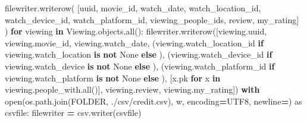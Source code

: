 \documentclass[
]{article}
\newenvironment{Shaded}{\begin{snugshade}}{\end{snugshade}}
\newcommand{\BuiltInTok}[1]{#1}
\newcommand{\ControlFlowTok}[1]{\textcolor[rgb]{0.13,0.29,0.53}{\textbf{#1}}}
\newcommand{\ImportTok}[1]{#1}
\newcommand{\KeywordTok}[1]{\textcolor[rgb]{0.13,0.29,0.53}{\textbf{#1}}}
\newcommand{\NormalTok}[1]{#1}
\newcommand{\OperatorTok}[1]{\textcolor[rgb]{0.81,0.36,0.00}{\textbf{#1}}}
\newcommand{\StringTok}[1]{\textcolor[rgb]{0.31,0.60,0.02}{#1}}
\newcommand{\VariableTok}[1]{\textcolor[rgb]{0.00,0.00,0.00}{#1}}
\begin{document}
\begin{Shaded}
\begin{Highlighting}[]
\NormalTok{                filewriter.writerow(}
\NormalTok{                    [}\StringTok{\textquotesingle{}uuid\textquotesingle{}}\NormalTok{, }\StringTok{\textquotesingle{}movie\_id\textquotesingle{}}\NormalTok{, }\StringTok{\textquotesingle{}watch\_date\textquotesingle{}}\NormalTok{, }\StringTok{\textquotesingle{}watch\_location\_id\textquotesingle{}}\NormalTok{, }\StringTok{\textquotesingle{}watch\_device\_id\textquotesingle{}}\NormalTok{, }\StringTok{\textquotesingle{}watch\_platform\_id\textquotesingle{}}\NormalTok{,}
                     \StringTok{\textquotesingle{}viewing\_people\_ids\textquotesingle{}}\NormalTok{, }\StringTok{\textquotesingle{}review\textquotesingle{}}\NormalTok{, }\StringTok{\textquotesingle{}my\_rating\textquotesingle{}}\NormalTok{]}
\NormalTok{                )}
                \ControlFlowTok{for}\NormalTok{ viewing }\KeywordTok{in}\NormalTok{ Viewing.objects.}\BuiltInTok{all}\NormalTok{():}
\NormalTok{                    filewriter.writerow([viewing.uuid, viewing.movie\_id, viewing.watch\_date,}
\NormalTok{                                         (viewing.watch\_location\_id }\ControlFlowTok{if}\NormalTok{ viewing.watch\_location }\KeywordTok{is} \KeywordTok{not} \VariableTok{None} \ControlFlowTok{else} \StringTok{\textquotesingle{}\textquotesingle{}}\NormalTok{),}
\NormalTok{                                         (viewing.watch\_device\_id }\ControlFlowTok{if}\NormalTok{ viewing.watch\_device }\KeywordTok{is} \KeywordTok{not} \VariableTok{None} \ControlFlowTok{else} \StringTok{\textquotesingle{}\textquotesingle{}}\NormalTok{),}
\NormalTok{                                         (viewing.watch\_platform\_id }\ControlFlowTok{if}\NormalTok{ viewing.watch\_platform }\KeywordTok{is} \KeywordTok{not} \VariableTok{None} \ControlFlowTok{else} \StringTok{\textquotesingle{}\textquotesingle{}}\NormalTok{),}
\NormalTok{                                         [x.pk }\ControlFlowTok{for}\NormalTok{ x }\KeywordTok{in}\NormalTok{ viewing.people\_with.}\BuiltInTok{all}\NormalTok{()], viewing.review, viewing.my\_rating])}
            \ControlFlowTok{with} \BuiltInTok{open}\NormalTok{(os.path.join(FOLDER, }\StringTok{\textquotesingle{}./csv/credit.csv\textquotesingle{}}\NormalTok{), }\StringTok{\textquotesingle{}w\textquotesingle{}}\NormalTok{,}
\NormalTok{                      encoding}\OperatorTok{=}\StringTok{\textquotesingle{}UTF8\textquotesingle{}}\NormalTok{, newline}\OperatorTok{=}\StringTok{\textquotesingle{}\textquotesingle{}}\NormalTok{) }\ImportTok{as}\NormalTok{ csvfile:}
\NormalTok{                filewriter }\OperatorTok{=}\NormalTok{ csv.writer(csvfile)}

\end{Highlighting}
\end{Shaded}
\end{document}
